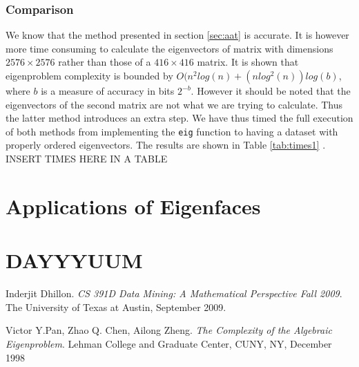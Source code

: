 \documentclass[10pt,twocolumn,letterpaper]{article}
\begin{document}
\subsubsection{Comparison}

We know that the method presented in section \ref{sec:aat} is accurate. It is however more time consuming to calculate the eigenvectors of matrix with dimensions $2576 \times 2576$ rather than those of a $416 \times 416$ matrix. It is shown \cite{Complex} that eigenproblem complexity is bounded by $O(n^2log(n)+(nlog^2(n))log(b)$, where $b$ is a measure of accuracy in bits $2^{-b}$. However it should be noted that the eigenvectors of the second matrix are not what we are trying to calculate. Thus the latter method introduces an extra step. We have thus timed the full execution of both methods from implementing the {\tt\small eig} function to having a dataset with properly ordered eigenvectors. The results are shown in Table \ref{tab:times1} .
INSERT TIMES HERE IN A TABLE

\section{Applications of Eigenfaces}



\section{DAYYYUUM}



{\small


}

\begin{thebibliography}{9}
Inderjit Dhillon. 
\textit{CS 391D Data Mining: A Mathematical Perspective Fall 2009}. 
The University of Texas at Austin, September 2009.

Victor Y.Pan, Zhao Q. Chen, Ailong Zheng. 
\textit{The Complexity of the Algebraic Eigenproblem}. 
Lehman College and Graduate Center, CUNY, NY, December 1998
\end{thebibliography}
\end{document}
